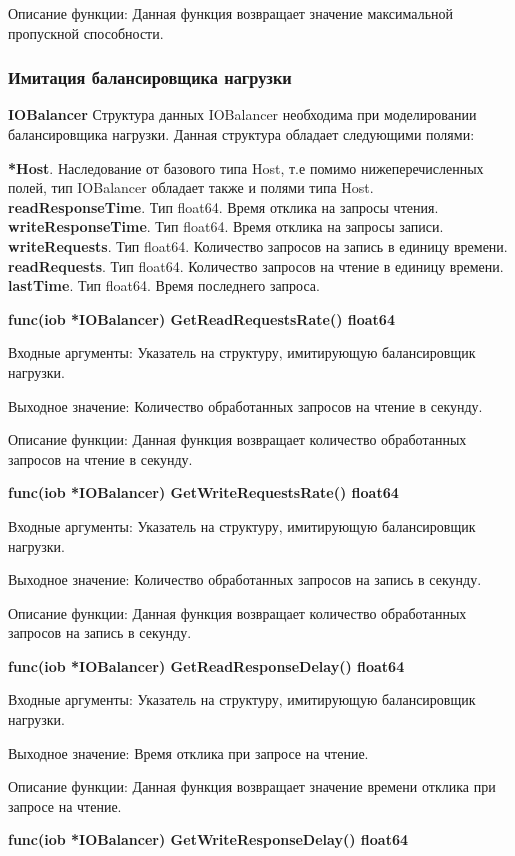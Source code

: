 Описание функции: Данная функция возвращает значение максимальной пропускной способности.

\subsubsection{Имитация балансировщика нагрузки}
\textbf{IOBalancer}
Структура данных IOBalancer необходима при моделировании балансировщика нагрузки. Данная структура обладает следующими полями:

\textbf{	*Host}. Наследование от базового типа Host, т.е помимо нижеперечисленных полей, тип IOBalancer обладает также и полями типа Host. 
\textbf{	readResponseTime}. Тип float64. Время отклика на запросы чтения.
\textbf{	writeResponseTime}. Тип float64. Время отклика на запросы записи.
\textbf{	writeRequests}. Тип float64. Количество запросов на запись в единицу времени.
\textbf{	readRequests}. Тип  float64. Количество запросов на чтение в единицу времени.
\textbf{	lastTime}. Тип float64. Время последнего запроса. 


\textbf{func(iob *IOBalancer) GetReadRequestsRate() float64}

Входные аргументы: Указатель на структуру, имитирующую балансировщик нагрузки.

Выходное значение: Количество обработанных запросов на чтение в секунду.

Описание функции: Данная функция возвращает количество обработанных запросов на чтение в секунду.

\textbf{func(iob *IOBalancer) GetWriteRequestsRate() float64}

Входные аргументы: Указатель на структуру, имитирующую балансировщик нагрузки.

Выходное значение: Количество обработанных запросов на запись в секунду. 

Описание функции: Данная функция возвращает количество обработанных запросов на запись в секунду.

\textbf{func(iob *IOBalancer) GetReadResponseDelay() float64}

Входные аргументы: Указатель на структуру, имитирующую балансировщик нагрузки.

Выходное значение: Время отклика при запросе на чтение. 

Описание функции: Данная функция возвращает значение времени отклика при запросе на чтение.

\textbf{func(iob *IOBalancer) GetWriteResponseDelay() float64}

